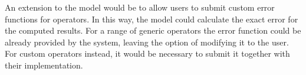 An extension to the model would be to allow users to submit custom error functions for operators. In this
way, the model could calculate the exact error for the computed results. For a range of generic
operators the error function could be already provided by the system, leaving the option of modifying it
to the user. For custom operators instead, it would be necessary to submit it together with their
implementation. 


